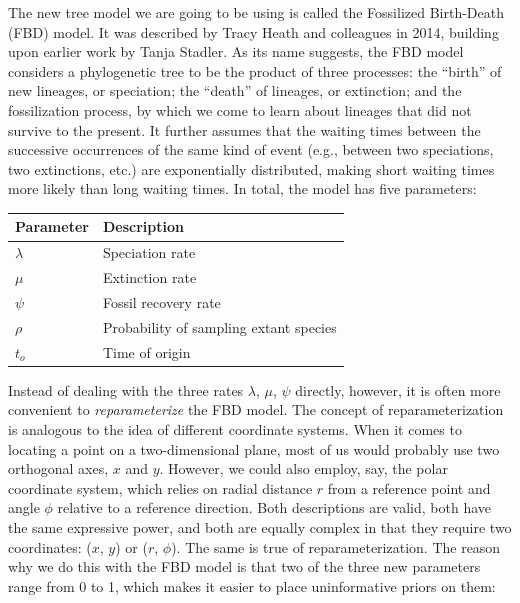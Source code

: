 \documentclass[12pt]{article}
\begin{document}
\vspace*{1ex}

\noindent The new tree model we are going to be using is called the Fossilized Birth-Death (FBD) model. It was described by Tracy Heath and colleagues in 2014, building upon earlier work by Tanja Stadler. As its name suggests, the FBD model considers a phylogenetic tree to be the product of three processes: the ``birth'' of new lineages, or speciation; the ``death'' of lineages, or extinction; and the fossilization process, by which we come to learn about lineages that did not survive to the present. It further assumes that the waiting times between the successive occurrences of the same kind of event (e.g., between two speciations, two extinctions, etc.) are exponentially distributed, making short waiting times more likely than long waiting times. In total, the model has five parameters: \\

\begin{table}[h]
\centering
\begin{tabular}{ll}
\toprule
\textbf{Parameter} & \textbf{Description} \\
\midrule
$\lambda$ & Speciation rate \\
$\mu$ & Extinction rate \\
$\psi$ & Fossil recovery rate \\
$\rho$ & Probability of sampling extant species \\
$t_o$ & Time of origin \\
\bottomrule
\end{tabular}
\label{table1}
\end{table}

\vspace*{-3ex}

\noindent Instead of dealing with the three rates $\lambda$, $\mu$, $\psi$ directly, however, it is often more convenient to \textit{reparameterize} the FBD model. The concept of reparameterization is analogous to the idea of different coordinate systems. When it comes to locating a point on a two-dimensional plane, most of us would probably use two orthogonal axes, $x$ and $y$. However, we could also employ, say, the polar coordinate system, which relies on radial distance $r$ from a reference point and angle $\phi$ relative to a reference direction. Both descriptions are valid, both have the same expressive power, and both are equally complex in that they require two coordinates: ($x$, $y$) or ($r$, $\phi$). The same is true of reparameterization. The reason why we do this with the FBD model is that two of the three new parameters range from 0 to 1, which makes it easier to place uninformative priors on them:
\end{document}
